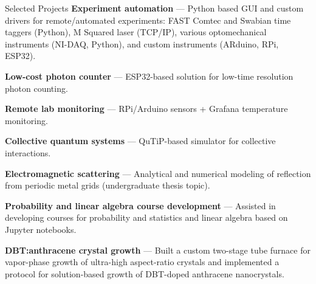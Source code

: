 \begin{rubric}{Selected Projects}
\entry* \textbf{Experiment automation} --- Python based GUI and custom drivers for remote/automated experiments: FAST Comtec and Swabian time taggers (Python), M Squared laser (TCP/IP), various optomechanical instruments (NI-DAQ, Python), and custom instruments (ARduino, RPi, ESP32). \par
\entry* \textbf{Low-cost photon counter} --- ESP32-based solution for low-time resolution photon counting.\par
\entry* \textbf{Remote lab monitoring} --- RPi/Arduino sensors + Grafana temperature monitoring.\par

\entry* \textbf{Collective quantum systems} --- QuTiP-based simulator for collective interactions.\par
\entry* \textbf{Electromagnetic scattering} --- Analytical and numerical modeling of reflection from periodic metal grids (undergraduate thesis topic).\par
\entry* \textbf{Probability and linear algebra course development} --- Assisted in developing courses for probability and statistics and linear algebra based on Jupyter notebooks. 

\entry* \textbf{DBT:anthracene crystal growth} --- Built a custom two-stage tube furnace for vapor-phase growth of ultra-high aspect-ratio crystals and implemented a protocol for solution-based growth of DBT-doped anthracene nanocrystals.\par

\par


\end{rubric}
